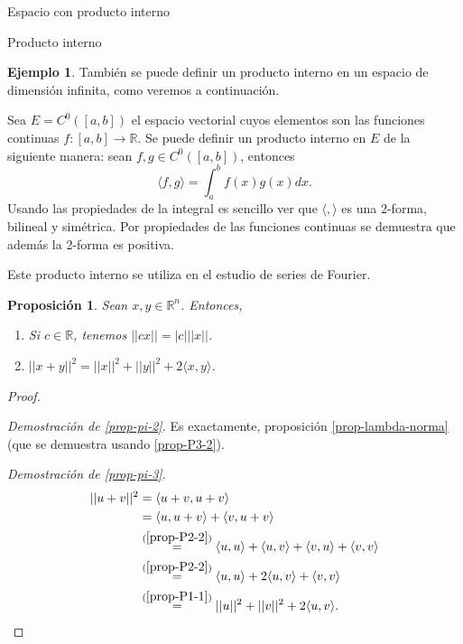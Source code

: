 \documentclass[a4paper,12pt,twoside,spanish,reqno]{amsbook}
\newtheorem{proposicion}[teorema]{Proposici\'on}
\theoremstyle{definition}
\newtheorem{ejemplo}{Ejemplo}[section]
\theoremstyle{remark}
\newcommand{\la}{\langle}
\newcommand{\ra}{\rangle}
\newcommand{\R}{\mathbb R}
\begin{document}
\begin{chapter}{Espacio con producto interno}
\begin{section}{Producto interno}
        \begin{ejemplo} También  se puede definir un producto interno en un espacio de dimensión infinita, como veremos a continuación.
            
            Sea $E = C^0([a,b])$ el espacio vectorial cuyos elementos son las funciones continuas $f: [a, b] \to\R$. Se puede definir un producto interno en $E$ de la siguiente manera: sean $f,g \in  C^0([a,b])$,  entonces
            \begin{equation*}
            \la f, g \ra = \int_a^b f(x)g(x) dx.
            \end{equation*}
            Usando las propiedades de la integral es sencillo ver que $\la , \ra $ es una 2-forma, bilineal y simétrica. Por propiedades de las funciones continuas se demuestra que además la 2-forma es positiva. 
            
            Este producto interno se utiliza en el estudio de series de Fourier.
        \end{ejemplo}
            
            
        
        
        \begin{proposicion} Sean   $x,y \in \R^n$. Entonces, 
            \begin{enumerate}
                \item\label{prop-pi-2} Si $c \in \R$, tenemos $||cx|| = |c|||x||$.
                \item\label{prop-pi-3} $||x+y||^2 = ||x||^2 + ||y||^2 + 2\la x,y\ra$. 
            \end{enumerate}
        \end{proposicion}
        \begin{proof}
            
            ${}^{}$
            
            \textit{Demostración de \ref{prop-pi-2}.}  Es exactamente, proposición \ref{prop-lambda-norma} (que se demuestra usando \ref{prop-P3-2}).
            
            \textit{Demostración de \ref{prop-pi-3}.}
            \begin{align*}
                ||u+v||^2 &= \la u+v,u+v\ra\\
                &= \la u,u+v\ra+ \la v,u+v\ra  \\
                &\overset{(\ref{prop-P2-2})}{=} \la u,u\ra+ \la u,v\ra+\la v,u\ra+ \la v,v\ra  \\
                &\overset{(\ref{prop-P2-2})}{=} \la u,u\ra+ 2\la u,v\ra+ \la v,v\ra  \\
                &\overset{(\ref{prop-P1-1})}{=} ||u||^2 + ||v||^2 + 2\la u,v\ra.
            \end{align*}
            

\end{proof}
\end{section}
\end{chapter}
\end{document}
